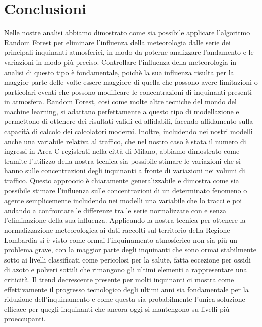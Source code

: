 \documentclass[a4paper]{report}
\begin{document}
\chapter{Conclusioni}
Nelle nostre analisi abbiamo dimostrato come sia possibile applicare l'algoritmo Random Forest per eliminare l'influenza della meteorologia dalle serie dei principali inquinanti atmosferici, in modo da poterne analizzare l'andamento e le variazioni in modo più preciso.  
Controllare l'influenza della meteorologia in analisi di questo tipo è fondamentale, poichè la sua influenza risulta per la maggior parte delle volte essere maggiore di quella che possono avere limitazioni o particolari eventi che possono modificare le concentrazioni di inquinanti presenti in atmosfera. Random Forest, così come molte altre tecniche del mondo del machine learning, si adattano perfettamente a questo tipo di modellazione e permettono di ottenere dei risultati validi ed affidabili, facendo affidamento sulla capacità di calcolo dei calcolatori moderni.  
Inoltre, includendo nei nostri modelli anche una variabile relativa al traffico, che nel nostro caso è stata il numero di ingressi in Area C registrati nella città di Milano, abbiamo dimostrato come tramite l'utilizzo della nostra tecnica sia possibile stimare le variazioni che si hanno sulle concentrazioni degli inquinanti a fronte di variazioni nei volumi di traffico. Questo approccio è chiaramente generalizzabile e dimostra come sia possibile stimare l'influenza sulle concentrazioni di un determinato fenomeno o agente semplicemente includendo nei modelli una variabile che lo tracci e poi andando a confrontare le differenze tra le serie normalizzate con e senza l'eliminazione della sua influenza.
Applicando la nostra tecnica per ottenere la normalizzazione meteorologica ai dati raccolti sul territorio della Regione Lombardia si è visto come ormai l'inquinamento atmosferico non sia più un problema grave, con la maggior parte degli inquinanti che sono ormai stabilmente sotto ai livelli classificati come pericolosi per la salute, fatta eccezione per ossidi di azoto e polveri sottili che rimangono gli ultimi elementi a rappresentare una criticità. 
Il trend decrescente presente per molti inquinanti ci mostra come effettivamente il progresso tecnologico degli ultimi anni sia fondamentale per la riduzione dell'inquinamento e come questa sia probabilmente l'unica soluzione efficace per quegli inquinanti che ancora oggi si mantengono su livelli più proeccupanti.  
\end{document}
